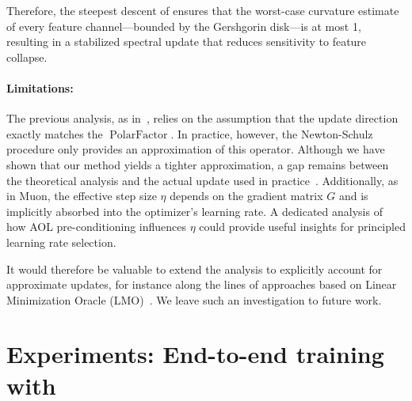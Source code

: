         Therefore, the steepest descent of \turbomuon ensures that the worst-case curvature estimate of every feature channel—bounded by the Gershgorin disk—is at most 1, resulting in a stabilized spectral update that 
        reduces sensitivity
        to feature collapse.

\paragraph{Limitations:} The previous analysis, as in~\cite{amsel2025polar,bernstein2024oldoptimizernewnorm}, relies on the assumption that the update direction exactly matches the $\operatorname{PolarFactor}$. In practice, however, the Newton-Schulz procedure only provides an approximation of this operator. Although we have shown that our method yields a tighter approximation, a gap remains between the theoretical analysis and the actual update used in practice~\cite{gonon2026insights}. 
Additionally, as in Muon, the effective step size $\eta$ depends on the gradient matrix $G$ and is implicitly absorbed into the optimizer’s learning rate. A dedicated analysis of how AOL pre-conditioning influences $\eta$ could provide useful insights for principled learning rate selection.

It would therefore be valuable to extend the analysis to explicitly account for approximate updates, for instance along the lines of approaches based on Linear Minimization Oracle (LMO)~\cite{pethick2025training}. We leave such an investigation to future work.
\section{Experiments: End-to-end training with \turbomuon}

